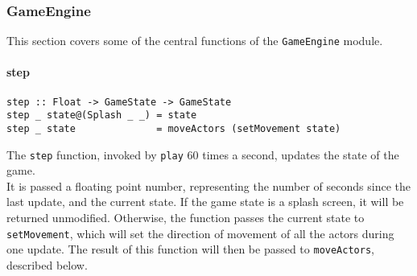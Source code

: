 \documentclass{article}
\begin{document}
        \subsubsection{GameEngine}
        This section covers some of the central functions of the \texttt{GameEngine} module.
        \paragraph{step}
        \begin{verbatim}
step :: Float -> GameState -> GameState
step _ state@(Splash _ _) = state
step _ state              = moveActors (setMovement state)
        \end{verbatim}
        \noindent The \texttt{step} function, invoked by \texttt{play} 60 times a second, updates the state of the game. \\
        \newline
        It is passed a floating point number, representing the number of seconds since the last update, and the current state. If the game state is a splash screen, it will be returned unmodified. Otherwise, the function passes the current state to \texttt{setMovement}, which will set the direction of movement of all the actors during one update. The result of this function will then be passed to \texttt{moveActors}, described below.
\end{document}
